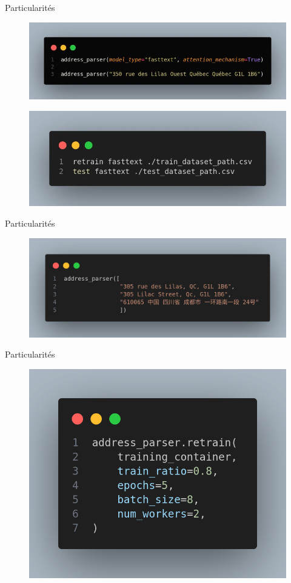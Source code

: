 \documentclass{beamer}
\begin{document}
	\begin{frame}{Particularités}
		\begin{figure}
			\centering
			\includegraphics[width=0.7\linewidth]{img/parsing_python1}
		\end{figure}
		\begin{figure}
			\centering
			\includegraphics[width=0.7\linewidth]{img/parsing_python}
		\end{figure}
	\end{frame}
	
	\begin{frame}{Particularités}
		\begin{figure}
			\centering
			\includegraphics[width=0.7\linewidth]{img/multiseg}
		\end{figure}
	\end{frame}
	
	\begin{frame}{Particularités}
		\begin{figure}
			\centering
			\includegraphics[width=0.6\linewidth]{img/retrain}
		\end{figure}
	\end{frame}
	
\end{document}
